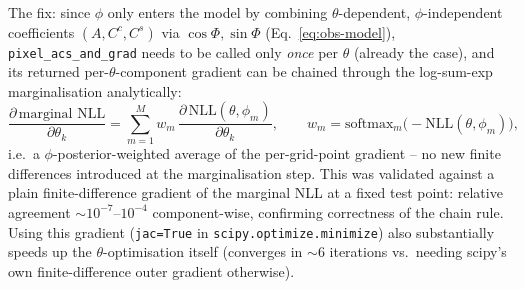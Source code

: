 \documentclass[11pt,a4paper]{article}
\newcommand{\code}[1]{\texttt{#1}}
\begin{document}
The fix: since $\phi$ only enters the model by combining $\theta$-dependent,
$\phi$-independent coefficients $(A,C^c,C^s)$ via $\cos\Phi,\sin\Phi$
(Eq.~\ref{eq:obs-model}), \code{pixel\_acs\_and\_grad} needs to be called
only \emph{once} per $\theta$ (already the case), and its returned
per-$\theta$-component gradient can be chained through the log-sum-exp
marginalisation analytically:
\begin{equation}
  \frac{\partial\,\text{marginal NLL}}{\partial\theta_k}
  = \sum_{m=1}^M w_m\,\frac{\partial\,\mathrm{NLL}(\theta,\phi_m)}{\partial\theta_k},
  \qquad w_m = \mathrm{softmax}_m\bigl(-\mathrm{NLL}(\theta,\phi_m)\bigr),
\end{equation}
i.e.\ a $\phi$-posterior-weighted average of the per-grid-point gradient --
no new finite differences introduced at the marginalisation step. This was
validated against a plain finite-difference gradient of the marginal NLL
at a fixed test point: relative agreement $\sim\!10^{-7}$--$10^{-4}$
component-wise, confirming correctness of the chain rule. Using this
gradient (\code{jac=True} in \code{scipy.optimize.minimize}) also
substantially speeds up the $\theta$-optimisation itself (converges in
$\sim\!6$ iterations vs.\ needing scipy's own finite-difference outer
gradient otherwise).
\end{document}
